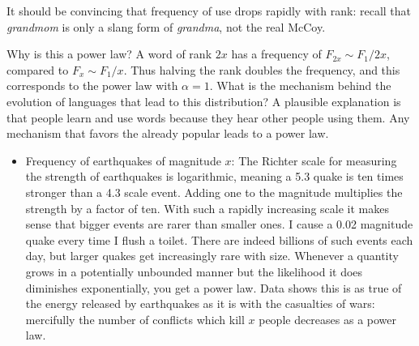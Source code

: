 \documentclass[10pt]{article}
\begin{document}
It should be convincing that frequency of use drops rapidly with rank: recall that \textit{grandmom} is only a slang form of \textit{grandma}, not the real McCoy.

Why is this a power law? A word of rank $2 x$ has a frequency of $F_{2 x} \sim F_{1} / 2 x$, compared to $F_{x} \sim F_{1} / x$. Thus halving the rank doubles the frequency, and this corresponds to the power law with $\alpha=1$. What is the mechanism behind the evolution of languages that lead to this distribution? A plausible explanation is that people learn and use words because they hear other people using them. Any mechanism that favors the already popular leads to a power law.

\begin{itemize}
  \item Frequency of earthquakes of magnitude $x$: The Richter scale for measuring the strength of earthquakes is logarithmic, meaning a 5.3 quake is ten times stronger than a 4.3 scale event. Adding one to the magnitude multiplies the strength by a factor of ten. With such a rapidly increasing scale it makes sense that bigger events are rarer than smaller ones. I cause a 0.02 magnitude quake every time I flush a toilet. There are indeed billions of such events each day, but larger quakes get increasingly rare with size. Whenever a quantity grows in a potentially unbounded manner but the likelihood it does diminishes exponentially, you get a power law. Data shows this is as true of the energy released by earthquakes as it is with the casualties of wars: mercifully the number of conflicts which kill $x$ people decreases as a power law.
\end{itemize}
\end{document}
